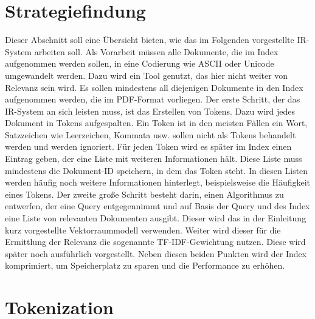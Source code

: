 \section{Strategiefindung}
Dieser Abschnitt soll eine Übersicht bieten, wie das im Folgenden vorgestellte IR-System arbeiten soll.
\newline
Als Vorarbeit müssen alle Dokumente, die im Index aufgenommen werden sollen, in eine Codierung wie ASCII oder Unicode umgewandelt werden. Dazu wird ein Tool genutzt, das hier nicht weiter von Relevanz sein wird.
Es sollen mindestens all diejenigen Dokumente in den Index aufgenommen werden, die im PDF-Format vorliegen.
\newline
Der erste Schritt, der das IR-System an sich leisten muss, ist das Erstellen von Tokens. Dazu wird jedes Dokument in Tokens aufgespalten. Ein Token ist in den meisten Fällen ein Wort, Satzzeichen wie Leerzeichen, Kommata usw. sollen nicht als Tokens behandelt werden und werden ignoriert.
\newline
Für jeden Token wird es später im Index einen Eintrag geben, der eine Liste mit weiteren Informationen hält. Diese Liste muss mindestens die Dokument-ID speichern, in dem das Token steht. In diesen Listen werden häufig noch weitere Informationen hinterlegt, beispielsweise die Häufigkeit eines Tokens.
\newline
Der zweite große Schritt besteht darin, einen Algorithmus zu entwerfen, der eine Query entgegennimmt und auf Basis der Query und des Index eine Liste von relevanten Dokumenten ausgibt. Dieser wird das in der Einleitung kurz vorgestellte Vektorraummodell verwenden. Weiter wird dieser für die Ermittlung der Relevanz die sogenannte TF-IDF-Gewichtung nutzen. Diese wird später noch ausführlich vorgestellt.
\newline
Neben diesen beiden Punkten wird der Index komprimiert, um Speicherplatz zu sparen und die Performance zu erhöhen.

\section{Tokenization}
